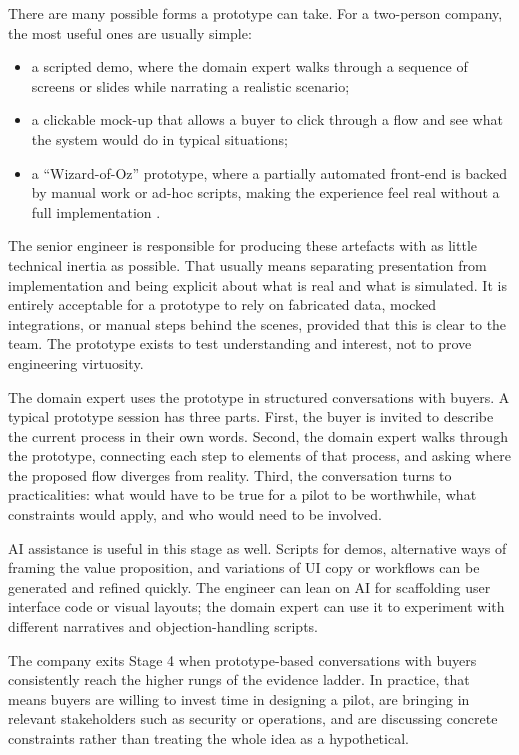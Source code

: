 \documentclass[10pt, a4paper, twocolumn]{article} %
\begin{document}
There are many possible forms a prototype can take. For a two-person company, the most useful ones are usually simple:

\begin{itemize}
  \item a scripted demo, where the domain expert walks through a sequence of screens or slides while narrating a realistic scenario;
  \item a clickable mock-up that allows a buyer to click through a flow and see what the system would do in typical situations;
  \item a “Wizard-of-Oz” prototype, where a partially automated front-end is backed by manual work or ad-hoc scripts, making the experience feel real without a full implementation \citep{bland2019testing}.
\end{itemize}

The senior engineer is responsible for producing these artefacts with as little technical inertia as possible. That usually means separating presentation from implementation and being explicit about what is real and what is simulated. It is entirely acceptable for a prototype to rely on fabricated data, mocked integrations, or manual steps behind the scenes, provided that this is clear to the team. The prototype exists to test understanding and interest, not to prove engineering virtuosity.

The domain expert uses the prototype in structured conversations with buyers. A typical prototype session has three parts. First, the buyer is invited to describe the current process in their own words. Second, the domain expert walks through the prototype, connecting each step to elements of that process, and asking where the proposed flow diverges from reality. Third, the conversation turns to practicalities: what would have to be true for a pilot to be worthwhile, what constraints would apply, and who would need to be involved.

AI assistance is useful in this stage as well. Scripts for demos, alternative ways of framing the value proposition, and variations of UI copy or workflows can be generated and refined quickly. The engineer can lean on AI for scaffolding user interface code or visual layouts; the domain expert can use it to experiment with different narratives and objection-handling scripts.

The company exits Stage 4 when prototype-based conversations with buyers consistently reach the higher rungs of the evidence ladder. In practice, that means buyers are willing to invest time in designing a pilot, are bringing in relevant stakeholders such as security or operations, and are discussing concrete constraints rather than treating the whole idea as a hypothetical.
\end{document}
